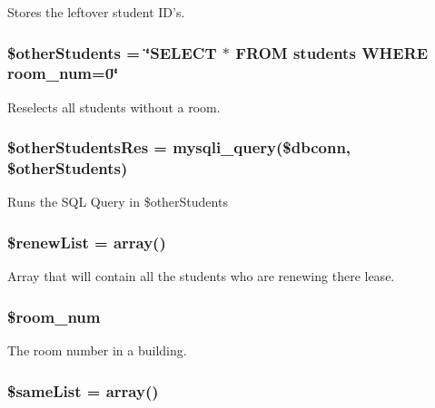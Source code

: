 \-Stores the leftover student \-I\-D's. \hypertarget{autoStudent_8php_a5ecf40283519ca1d11b92be0685c64a6}{
\subsubsection[{\$other\-Students}]{\setlength{\rightskip}{0pt plus 5cm}\$other\-Students = \char`\"{}\-S\-E\-L\-E\-C\-T $\ast$ \-F\-R\-O\-M students \-W\-H\-E\-R\-E room\-\_\-num=0\char`\"{}}}\label{autoStudent_8php_a5ecf40283519ca1d11b92be0685c64a6}
\-Reselects all students without a room. \hypertarget{autoStudent_8php_a95f5d9e24eab0566eee61e4cc48e9028}{
\subsubsection[{\$other\-Students\-Res}]{\setlength{\rightskip}{0pt plus 5cm}\$other\-Students\-Res = mysqli\-\_\-query(\$dbconn, \$other\-Students)}}\label{autoStudent_8php_a95f5d9e24eab0566eee61e4cc48e9028}
\-Runs the \-S\-Q\-L \-Query in \$other\-Students \hypertarget{autoStudent_8php_a4b86be10feafcf37058c5a121b5fff28}{
\subsubsection[{\$renew\-List}]{\setlength{\rightskip}{0pt plus 5cm}\$renew\-List = array()}}\label{autoStudent_8php_a4b86be10feafcf37058c5a121b5fff28}
\-Array that will contain all the students who are renewing there lease. \hypertarget{autoStudent_8php_ac8f3b2b9a28b7619de496a616ba2de94}{
\subsubsection[{\$room\-\_\-num}]{\setlength{\rightskip}{0pt plus 5cm}\$room\-\_\-num}}\label{autoStudent_8php_ac8f3b2b9a28b7619de496a616ba2de94}
\-The room number in a building. \hypertarget{autoStudent_8php_a9f9bc0c3bc8c3e3f16ec676735e123e8}{
\subsubsection[{\$same\-List}]{\setlength{\rightskip}{0pt plus 5cm}\$same\-List = array()}}\label{autoStudent_8php_a9f9bc0c3bc8c3e3f16ec676735e123e8}
